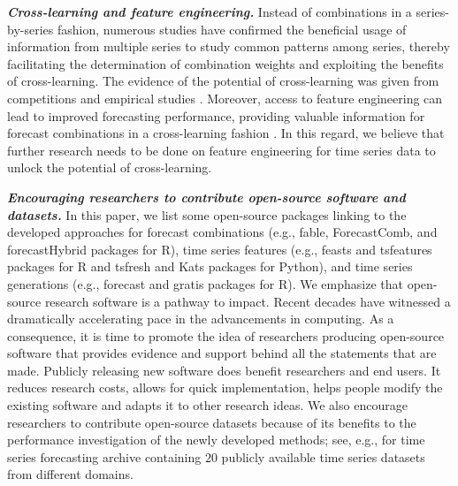 \documentclass[11pt]{article}
\newcommand{\pkg}[1]{{\normalfont\fontseries{b}\selectfont #1}}
\let\proglang=\textsf
\begin{document}
\textbf{\textit{Cross-learning and feature engineering.}} Instead of combinations in a series-by-series fashion, numerous studies have confirmed the beneficial usage of information from multiple series to study common patterns among series, thereby facilitating the determination of combination weights and exploiting the benefits of cross-learning. The evidence of the potential of cross-learning was given from competitions \citep[e.g.,][]{Makridakis2020-hu,Makridakis2020-fn} and empirical studies \citep[e.g.,][]{Ma2021-np}. Moreover, access to feature engineering can lead to improved forecasting performance, providing valuable information for forecast combinations in a cross-learning fashion \citep{Montero-Manso2020-tq,Kang2021-ol}. In this regard, we believe that further research needs to be done on feature engineering for time series data to unlock the potential of cross-learning.

\textbf{\textit{Encouraging researchers to contribute open-source software and datasets.}} In this paper, we list some open-source packages linking to the developed approaches for forecast combinations (e.g., \pkg{fable}, \pkg{ForecastComb}, and \pkg{forecastHybrid} packages for \proglang{R}), time series features (e.g., \pkg{feasts} and \pkg{tsfeatures} packages for \proglang{R} and \pkg{tsfresh} and \pkg{Kats} packages for \proglang{Python}), and time series generations (e.g., \pkg{forecast} and \pkg{gratis} packages for \proglang{R}). We emphasize that open-source research software is a pathway to impact. Recent decades have witnessed a dramatically accelerating pace in the advancements in computing. As a consequence, it is time to promote the idea of researchers producing open-source software that provides evidence and support behind all the statements that are made. Publicly releasing new software does benefit researchers and end users. It reduces research costs, allows for quick implementation, helps people modify the existing software and adapts it to other research ideas. We also encourage researchers to contribute open-source datasets because of its benefits to the performance investigation of the newly developed methods; see, e.g., \citet{Godahewa2021-mo,Godahewa2021-wb} for time series forecasting archive containing $20$ publicly available time series datasets from different domains.
\end{document}

